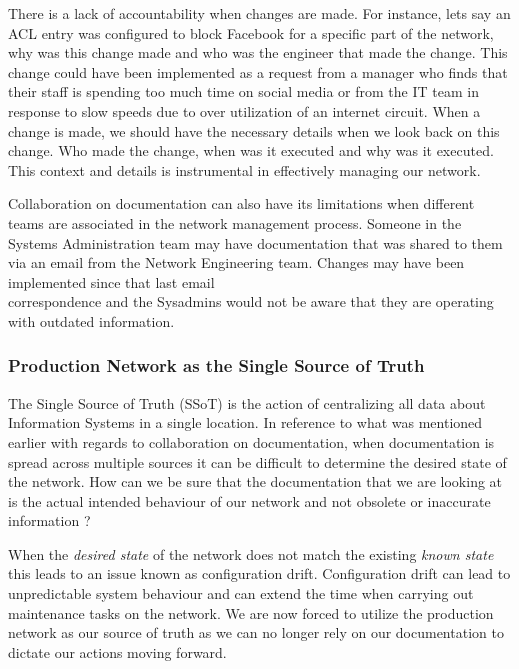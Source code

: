 \documentclass[12pt, letterpaper]{article}
\begin{document}
\smallskip

There is a lack of accountability when changes are made. For instance, lets say an ACL entry was configured to block Facebook for a specific part of the network, why was this change made and who was the engineer that made the change. This change could have been implemented as a request from a manager who finds that their staff is spending too much time on social media or from the IT team in response to slow speeds due to over utilization of an internet circuit.
When a change is made, we should have the necessary details when we look back on this change. Who made the change, when was it executed and why was it executed. This context and details is instrumental in effectively managing our network.

\smallskip

Collaboration on documentation can also have its limitations when different teams are associated in the network management process. Someone in the Systems Administration team may have documentation that was shared to them via an email from the Network Engineering team. Changes may have been implemented since that last email \\ correspondence and the Sysadmins would not be aware that they are operating with outdated information.  


	\subsubsection{Production Network as the Single Source of Truth}
The Single Source of Truth (SSoT) is the action of centralizing all data about Information Systems in a single location. In reference to what was mentioned earlier with regards to collaboration on documentation, when documentation is spread across multiple sources it can be difficult to determine the desired state of the network. How can we be sure that the documentation that we are looking at is the actual intended behaviour of our network and not obsolete or inaccurate information ?

\smallskip

When the \textit{desired state} of the network does not match the existing \textit{known state} this leads to an issue known as configuration drift. Configuration drift can lead to unpredictable system behaviour and can extend the time when carrying out maintenance tasks on the network. We are now forced to utilize the production network as our source of truth as we can no longer rely on our documentation to dictate our actions moving forward. 
\end{document}
